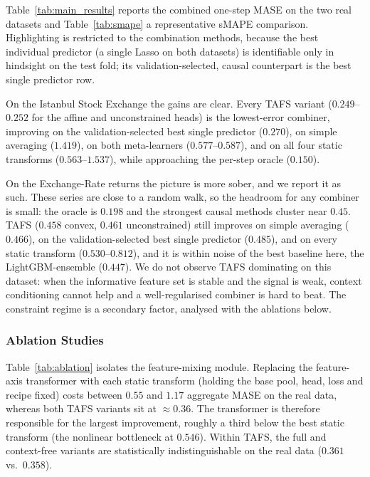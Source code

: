 \documentclass[journal]{IEEEtran}
\begin{document}



Table~\ref{tab:main_results} reports the combined one-step MASE on the two real datasets and Table~\ref{tab:smape} a representative sMAPE comparison. Highlighting is restricted to the combination methods, because the best individual predictor (a single Lasso on both datasets) is identifiable only in hindsight on the test fold; its validation-selected, causal counterpart is the best single predictor row.

On the Istanbul Stock Exchange the gains are clear. Every TAFS variant ($0.249$--$0.252$ for the affine and unconstrained heads) is the lowest-error combiner, improving on the validation-selected best single predictor ($0.270$), on simple averaging ($1.419$), on both meta-learners ($0.577$--$0.587$), and on all four static transforms ($0.563$--$1.537$), while approaching the per-step oracle ($0.150$).

On the Exchange-Rate returns the picture is more sober, and we report it as such. These series are close to a random walk, so the headroom for any combiner is small: the oracle is $0.198$ and the strongest causal methods cluster near $0.45$. TAFS ($0.458$ convex, $0.461$ unconstrained) still improves on simple averaging ($0.466$), on the validation-selected best single predictor ($0.485$), and on every static transform ($0.530$--$0.812$), and it is within noise of the best baseline here, the LightGBM-ensemble ($0.447$). We do not observe TAFS dominating on this dataset: when the informative feature set is stable and the signal is weak, context conditioning cannot help and a well-regularised combiner is hard to beat. The constraint regime is a secondary factor, analysed with the ablations below.

\subsubsection{Ablation Studies}





Table~\ref{tab:ablation} isolates the feature-mixing module. Replacing the feature-axis transformer with each static transform (holding the base pool, head, loss and recipe fixed) costs between $0.55$ and $1.17$ aggregate MASE on the real data, whereas both TAFS variants sit at $\approx0.36$. The transformer is therefore responsible for the largest improvement, roughly a third below the best static transform (the nonlinear bottleneck at $0.546$). Within TAFS, the full and context-free variants are statistically indistinguishable on the real data ($0.361$ vs.\ $0.358$).
\end{document}

